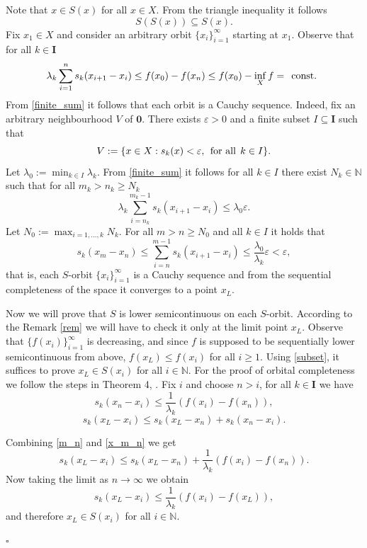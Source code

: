 \documentclass{article}
\def\text#1{\,\;\hbox{#1}\;\,}
\newcommand{\N}{\mathbb{N}}
\renewenvironment{proof}
         {\begin{trivlist}\item[
         {\bf Proof.}]}{{\hfill $\square$} \end{trivlist}}
\begin{document}
\begin{proof}
Note that $x \in S(x)$ for all $x \in X$. From the triangle inequality it follows 
\begin{equation} 
\label{subset}
S(S(x)) \subseteq S(x).
\end{equation}
Fix $x_1 \in X$ and consider an arbitrary orbit $\{x_i\}_{i=1}^{\infty}$ starting at $x_1$. Observe that for all $k \in \mathbf{I}$
\begin{equation}
\label{finite_sum}  
\lambda_k \sum_{i=1}^n s_k(x_{i+1}-x_i) \leq f(x_0)-f(x_n) \leq f(x_0)-\inf_X f = \text{const.}
\end{equation}
From \ref{finite_sum} it follows that each orbit is a Cauchy sequence. Indeed, fix an arbitrary neighbourhood $V$ of $\mathbf{0}$. There exists $\varepsilon > 0$ and a finite subset $I \subseteq \mathbf{I}$ such that
\[V:=\{x \in X: s_k(x)<\varepsilon, \text{for all} k \in I\}.\]
Let $\displaystyle \lambda_0:=\min_{k \in I} \lambda_k$. From \ref{finite_sum} it follows for all $k \in I$ there exist $N_k \in \N$ such that for all $m_k > n_k \geq N_k$
$$ \displaystyle
{\lambda_k \sum_{i=n_k}^{m_k-1} s_k(x_{i+1}-x_i) \leq \lambda_0 \varepsilon.}
$$
Let $\displaystyle N_0:=\max_{i=1,\dots,k} N_k$. For all $m>n \geq N_0$ and all $k \in I$ it holds that
$$ 
s_k(x_m-x_n) \leq \sum_{i=n}^{m-1} s_k(x_{i+1}-x_i) \leq \frac{\lambda_0}{\lambda_k} \varepsilon < \varepsilon,
$$
that is, each $S$-orbit $\{x_i\}_{i=1}^{\infty}$ is a Cauchy sequence and from the sequential completeness of the space it converges to a point $x_L$.

Now we will prove that $S$ is lower semicontinuous on each $S$-orbit. According to the Remark \ref{rem} we will have to check it only at the limit point $x_L$. Observe that $\{f(x_{i})\}_{i=1}^\infty$ is decreasing, and since $f$ is supposed to be sequentially lower semicontinuous from above, $f(x_L)\le f(x_{i})$ for all $i\ge 1$. Using \ref{subset}, it suffices to prove $x_L \in S(x_i)$ for all $i \in \N$. For the proof of orbital completeness we follow the steps in Theorem 4, \cite{Hammel_un}. Fix $i$ and choose $n >i$, for all $k \in \mathbf{I}$ we have
\begin{equation} \label{m_n}
s_k(x_n-x_i) \leq \frac{1}{\lambda_k}(f(x_i)-f(x_n)),
\end{equation}
\begin{equation} \label{x_m_n}
s_k(x_L-x_i) \leq s_k(x_L-x_n) + s_k(x_n-x_i).
\end{equation}

Combining \ref{m_n} and \ref{x_m_n} we get
\[s_k(x_L-x_i) \leq s_k(x_L-x_n)+\frac{1}{\lambda_k}(f(x_i)-f(x_n)).\]
Now taking the limit as $n \rightarrow \infty$ we obtain
\[s_k(x_L-x_i) \leq \frac{1}{\lambda_k}(f(x_i)-f(x_L)),\]
and therefore $x_L \in S(x_i)$ for all $i \in \N$.


\end{proof}
\end{document}
